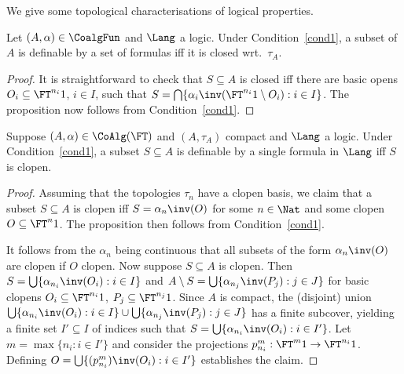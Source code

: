\documentclass{entcs}
\begin{document}
\noindent
We give some topological characterisations of logical properties.

\begin{prop}\label{prop:definable=closed}
  Let $(A,\alpha)\in\CoalgFun$ and $\Lang$ a logic. Under
  Condition~\ref{cond1}, a subset of $A$ is definable by a set of formulas iff
  it is closed wrt.\ $\tau_A$.
\end{prop}

\begin{proof}
  It is straightforward to check that $S\subseteq A$ is closed iff there are
  basic opens $O_i\subseteq\FT^{n_i}1$, $i\in I$, such that $S=
  \bigcap\{\alpha_i\inv(\FT^{n_i}1\setminus O_i):i\in I\}$. The proposition
  now follows from Condition~\ref{cond1}.
\end{proof}

\begin{prop}\label{prop:definable=clopen}
  Suppose $(A, \alpha) \in \CoAlg(\FT)$ and $(A, \tau_A)$ compact and $\Lang$
  a logic. Under Condition~\ref{cond1}, a subset $S \subseteq A$ is definable
  by a single formula in $\Lang$ iff $S$ is clopen.
\end{prop}

\begin{proof}
  Assuming that the topologies $\tau_n$ have a clopen basis, we claim that a
  subset $S\subseteq A$ is clopen iff $S=\alpha_n\inv(O)$ for some $n\in\Nat$
  and some clopen $O\subseteq\FT^n 1$. The proposition then follows from
  Condition~\ref{cond1}.
  
  It follows from the $\alpha_n$ being continuous that all subsets of the form
  $\alpha_n\inv(O)$ are clopen if $O$ clopen. Now suppose $S\subseteq A$ is
  clopen. Then $S=\bigcup\{\alpha_{n_i}\inv(O_i):i\in I\}$ and $A\setminus
  S=\bigcup\{\alpha_{n_j}\inv(P_j):j\in J\}$ for basic clopens
  $O_i\subseteq\FT^{n_i} 1$, $P_j\subseteq\FT^{n_j} 1$. Since $A$ is compact,
  the (disjoint) union $\bigcup\{\alpha_{n_i}\inv(O_i):i\in I\} \cup
  \bigcup\{\alpha_{n_j}\inv(P_j):j\in J\}$ has a finite subcover,
%
  yielding a finite set $I'\subseteq I$ of indices such that $S
  =\bigcup\{\alpha_{n_i}\inv(O_i):i\in I'\} $. Let $m = \max \lbrace n_i:i\in
  I'\rbrace$ and consider the projections $p^m_{n_i}:\FT^m 1\to\FT^{n_i}1$.
  Defining $O=\bigcup\{(p^m_{n_i})\inv(O_{i}): i\in I'\}$ establishes the
  claim.
\end{proof}
\end{document}
